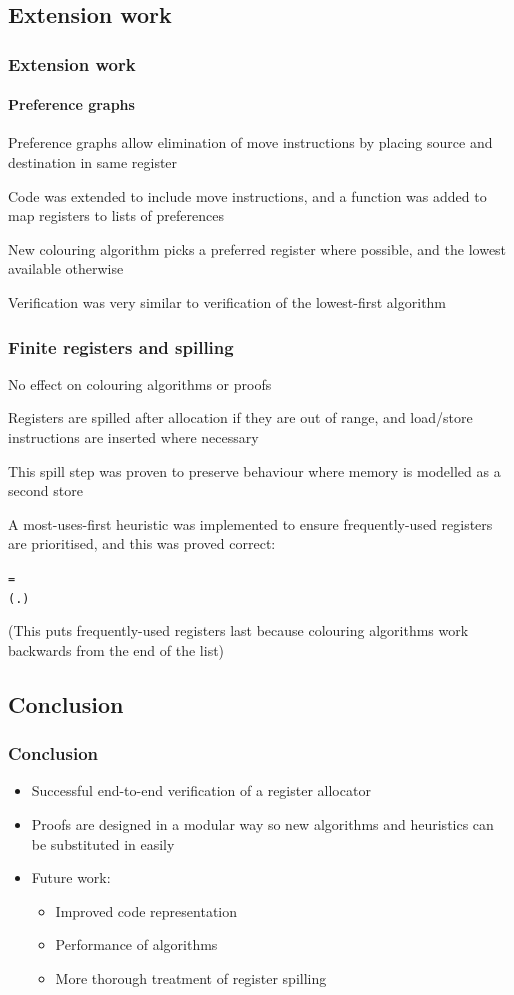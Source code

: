 \documentclass{beamer}
\begin{document}
\subsection{Extension work}
\begin{frame}[containsverbatim]
\frametitle{Extension work}
\framesubtitle{Preference graphs}
Preference graphs allow elimination of move instructions by placing source and destination in same register

Code was extended to include move instructions, and a function was added to map registers to lists of preferences

New colouring algorithm picks a preferred register where possible, and the lowest available otherwise

Verification was very similar to verification of the lowest-first algorithm
\end{frame}

\begin{frame}[containsverbatim]
\frametitle{Finite registers and spilling}
No effect on colouring algorithms or proofs

Registers are spilled after allocation if they are out of range, and load/store instructions are inserted where necessary

This spill step was proven to preserve behaviour where memory is modelled as a second store

A most-uses-first heuristic was implemented to ensure frequently-used registers are prioritised, and this was proved correct:

\begin{alltt}\small
	\HOLTokenTurnstile{}    =
    (\HOLTokenLambda{} .   \HOLTokenLt{}  ) 
\end{alltt}

(This puts frequently-used registers last because colouring algorithms work backwards from the end of the list)
\end{frame}

\subsection{Conclusion}
\begin{frame}
\frametitle{Conclusion}
\begin{itemize}
	\item Successful end-to-end verification of a register allocator
	\item Proofs are designed in a modular way so new algorithms and heuristics can be substituted in easily
	\item Future work:
	\begin{itemize}
		\item Improved code representation
		\item Performance of algorithms
		\item More thorough treatment of register spilling
	\end{itemize}
\end{itemize}
\end{frame}
\end{document}
